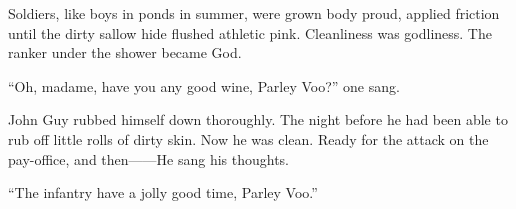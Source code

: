 Soldiers, like boys in ponds in summer, were grown body proud, applied friction until the dirty sallow hide flushed athletic pink. Cleanliness was godliness. The ranker under the shower became God.

``Oh, madame, have you any good wine, Parley Voo?'' one sang.

John Guy rubbed himself down thoroughly. The night before he had been able to rub off little rolls of dirty skin. Now he was clean. Ready for the attack on the pay-office, and then------He sang his thoughts.

``The infantry have a jolly good time, Parley Voo.''
